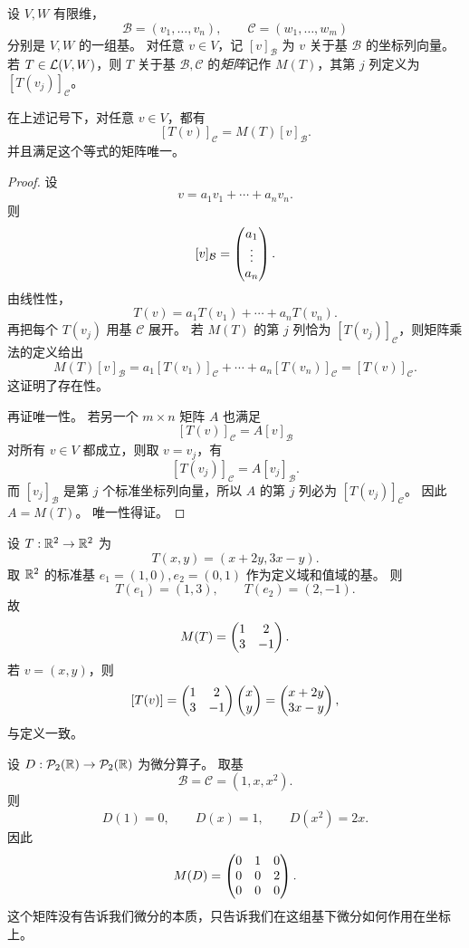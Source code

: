 \begin{definition} 设 $V,W$ 有限维， \[ \mathcal{B}=(v_1,\dots,v_n),\qquad
\mathcal{C}=(w_1,\dots,w_m) \] 分别是 $V,W$ 的一组基。 对任意 $v\in V$，记 $[v]_{\mathcal{B}}$ 为 $v$
关于基 $\mathcal{B}$ 的坐标列向量。 若 $T\in\mathcal{L}(V,W)$，则 $T$ 关于基 $\mathcal{B},\mathcal{C}$
的\emph{矩阵}记作 $M(T)$，其第 $j$ 列定义为 $[T(v_j)]_{\mathcal{C}}$。 \end{definition}

\begin{theorem} 在上述记号下，对任意 $v\in V$，都有 \[ [T(v)]_{\mathcal{C}}=M(T)[v]_{\mathcal{B}}. \]
并且满足这个等式的矩阵唯一。 \end{theorem}

\begin{proof} 设 \[ v=a_1v_1+\cdots+a_nv_n. \] 则 \[ [v]_{\mathcal{B}}=\begin{pmatrix} a_1\\ \vdots
\\ a_n \end{pmatrix}. \] 由线性性， \[ T(v)=a_1T(v_1)+\cdots+a_nT(v_n). \] 再把每个 $T(v_j)$ 用基 $\mathcal{C}$
展开。 若 $M(T)$ 的第 $j$ 列恰为 $[T(v_j)]_{\mathcal{C}}$，则矩阵乘法的定义给出 \[
M(T)[v]_{\mathcal{B}}=a_1[T(v_1)]_{\mathcal{C}}+\cdots+a_n[T(v_n)]_{\mathcal{C}}=[T(v)]_{\mathcal{C}}.
\] 这证明了存在性。

再证唯一性。 若另一个 $m\times n$ 矩阵 $A$ 也满足 \[ [T(v)]_{\mathcal{C}}=A[v]_{\mathcal{B}} \] 对所有
$v\in V$ 都成立，则取 $v=v_j$，有 \[ [T(v_j)]_{\mathcal{C}}=A[v_j]_{\mathcal{B}}. \] 而
$[v_j]_{\mathcal{B}}$ 是第 $j$ 个标准坐标列向量，所以 $A$ 的第 $j$ 列必为 $[T(v_j)]_{\mathcal{C}}$。 因此
$A=M(T)$。 唯一性得证。 \end{proof}

\begin{example} 设 $T:\mathbb{R}^2\to\mathbb{R}^2$ 为 \[ T(x,y)=(x+2y,3x-y). \] 取 $\mathbb{R}^2$ 的标准基
$e_1=(1,0),e_2=(0,1)$ 作为定义域和值域的基。 则 \[ T(e_1)=(1,3),\qquad T(e_2)=(2,-1). \] 故 \[
M(T)=\begin{pmatrix} 1 & 2\\ 3 & -1 \end{pmatrix}. \] 若 $v=(x,y)$，则 \[ [T(v)] = \begin{pmatrix} 1 & 2\\ 3 & -1 \end{pmatrix}\begin{pmatrix} x\\ y \end{pmatrix}=
\begin{pmatrix} x+2y\\ 3x-y \end{pmatrix}, \] 与定义一致。 \end{example}

\begin{example} 设 $D:\mathcal{P}_2(\mathbb{R})\to\mathcal{P}_2(\mathbb{R})$ 为微分算子。 取基 \[
\mathcal{B}=\mathcal{C}=(1,x,x^2). \] 则 \[ D(1)=0,\qquad D(x)=1,\qquad D(x^2)=2x. \] 因此
\[ M(D)=\begin{pmatrix} 0 & 1 & 0\\ 0 & 0 & 2\\ 0 & 0 & 0 \end{pmatrix}. \]
这个矩阵没有告诉我们微分的本质，只告诉我们在这组基下微分如何作用在坐标上。 \end{example}

